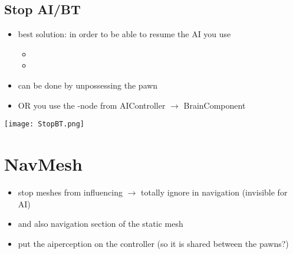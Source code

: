             \subsection{Stop AI/BT}
                 \begin{itemize}
                    \item best solution: in order to be able to resume the AI you use 
                    \begin{itemize}
                        \item {}
                        \item {}
                    \end{itemize}
                    \item can be done by unpossessing the pawn
                    \item OR you use the  -node from AIController $\rightarrow$ BrainComponent
                 \end{itemize}
                  \texttt{[image: StopBT.png]}


    \section{NavMesh}
        \begin{itemize}
            \item stop meshes from influencing $\rightarrow$ totally ignore in navigation (invisible for AI)
            \item and also navigation section of the static mesh
            \item put the aiperception on the controller (so it is shared between the pawns?)
        \end{itemize}



